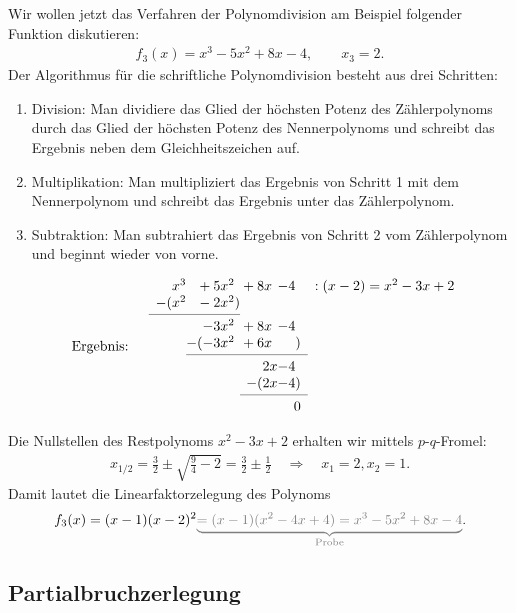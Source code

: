 Wir wollen jetzt das Verfahren der Polynomdivision am Beispiel folgender Funktion diskutieren: 
\begin{align}
    f_3(x) = x^3 - 5x^2 + 8x -4, \qquad x_3 = 2.
\end{align}
Der Algorithmus für die schriftliche Polynomdivision besteht aus drei Schritten:
\begin{enumerate}
    \item Division: Man dividiere das Glied der höchsten Potenz des Zählerpolynoms durch das Glied der höchsten Potenz des Nennerpolynoms und schreibt das Ergebnis neben dem Gleichheitszeichen auf. 
    \item Multiplikation: Man multipliziert das Ergebnis von Schritt 1 mit dem Nennerpolynom und schreibt das Ergebnis unter das Zählerpolynom. 
    \item Subtraktion: Man subtrahiert das Ergebnis von Schritt 2 vom Zählerpolynom und beginnt wieder von vorne.
\end{enumerate}
\begin{align}
    \qq{Ergebnis: }\begin{array}{r@{} r@{} r@{} r r}
        x^3 &{}+5x^2\hphantom{)}&{}+8x\hphantom{)}&-4\hphantom{)} &:(x-2) = x^2 -3x +2 \\
      -(x^2 &{}-2x^2) &\\
      \cmidrule{1-2}
            & -3x^2\hphantom{)} &{}+8x\hphantom{)}&-4\hphantom{)}\\
            &-(-3x^2\hphantom{)} &{}+6x\hphantom{)}&\hphantom{-4}) \\
      \cmidrule{2-4}
            & &{}2x&-4\hphantom{)}\\
            & &-(2x&-4)\\
      \cmidrule{3-4} 
            & & & 0
    \end{array}
\end{align}

Die Nullstellen des Restpolynoms $x^2 -3x +2$ erhalten wir mittels $p$-$q$-Fromel: 
\begin{align}
    x_{1/2} = \frac{3}{2} \pm \sqrt{\frac{9}{4}-2} = \frac{3}{2} \pm \frac{1}{2} \quad \Rightarrow \quad x_1 = 2, x_2 =1.
\end{align}
Damit lautet die Linearfaktorzelegung des Polynoms  
\begin{align}
    f_3(x) = (x-1) (x-2)^2 \textcolor{gray}{\underbrace{= (x-1)(x^2-4x+4) = x^3-5x^2 + 8x-4}_{\text{Probe}}}.
\end{align}

\subsection{Partialbruchzerlegung}


